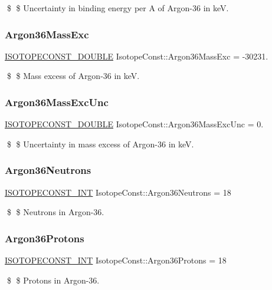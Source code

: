 \$ \$ Uncertainty in binding energy per A of Argon-\/36 in keV. \mbox{\label{group___isotope_const-_argon-_ar36_ga1bdb0a006e3549c3ad6e1743acdff3f3}} 
\subsubsection{\texorpdfstring{Argon36\+Mass\+Exc}{Argon36MassExc}}
{\footnotesize\ttfamily \mbox{\hyperlink{group___isotope_const-_macros_ga8f45a7272ce02c0b4c65c44636ed719a}{I\+S\+O\+T\+O\+P\+E\+C\+O\+N\+S\+T\+\_\+\+D\+O\+U\+B\+LE}} Isotope\+Const\+::\+Argon36\+Mass\+Exc = -\/30231.}

\$ \$ Mass excess of Argon-\/36 in keV. \mbox{\label{group___isotope_const-_argon-_ar36_ga0593ae6e88506e098d9cd80747c4c5ba}} 
\subsubsection{\texorpdfstring{Argon36\+Mass\+Exc\+Unc}{Argon36MassExcUnc}}
{\footnotesize\ttfamily \mbox{\hyperlink{group___isotope_const-_macros_ga8f45a7272ce02c0b4c65c44636ed719a}{I\+S\+O\+T\+O\+P\+E\+C\+O\+N\+S\+T\+\_\+\+D\+O\+U\+B\+LE}} Isotope\+Const\+::\+Argon36\+Mass\+Exc\+Unc = 0.}

\$ \$ Uncertainty in mass excess of Argon-\/36 in keV. \mbox{\label{group___isotope_const-_argon-_ar36_ga43db47d07feaedc03232cf3fe5a13651}} 
\subsubsection{\texorpdfstring{Argon36\+Neutrons}{Argon36Neutrons}}
{\footnotesize\ttfamily \mbox{\hyperlink{group___isotope_const-_macros_ga5f18360b3e99483a35c32d789e62621c}{I\+S\+O\+T\+O\+P\+E\+C\+O\+N\+S\+T\+\_\+\+I\+NT}} Isotope\+Const\+::\+Argon36\+Neutrons = 18}

\$ \$ Neutrons in Argon-\/36. \mbox{\label{group___isotope_const-_argon-_ar36_ga147194de6a0468168bc5de10b9f4fbcc}} 
\subsubsection{\texorpdfstring{Argon36\+Protons}{Argon36Protons}}
{\footnotesize\ttfamily \mbox{\hyperlink{group___isotope_const-_macros_ga5f18360b3e99483a35c32d789e62621c}{I\+S\+O\+T\+O\+P\+E\+C\+O\+N\+S\+T\+\_\+\+I\+NT}} Isotope\+Const\+::\+Argon36\+Protons = 18}

\$ \$ Protons in Argon-\/36. 